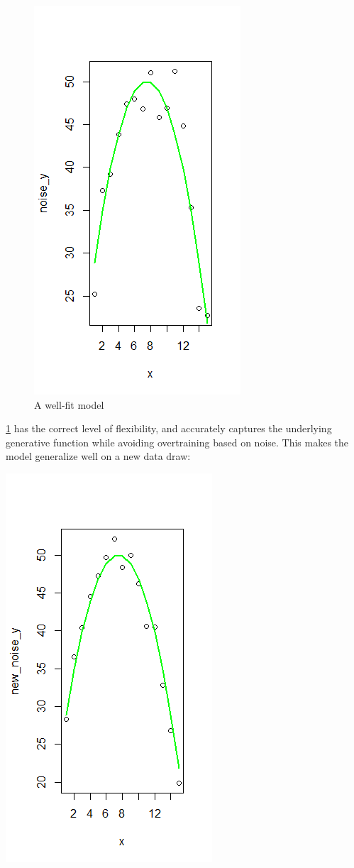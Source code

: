 \documentclass[12pt,twoside]{reedthesis}
\begin{document}
\begin{figure}
\centering
\includegraphics{figure/true.png}
\caption{\label{fig:goodmod}A well-fit model}
\end{figure}
\ref{fig:goodmod} has the correct level of flexibility, and accurately
captures the underlying generative function while avoiding overtraining
based on noise. This makes the model generalize well on a new data draw:

\includegraphics{figure/stayGood.png}
\end{document}
